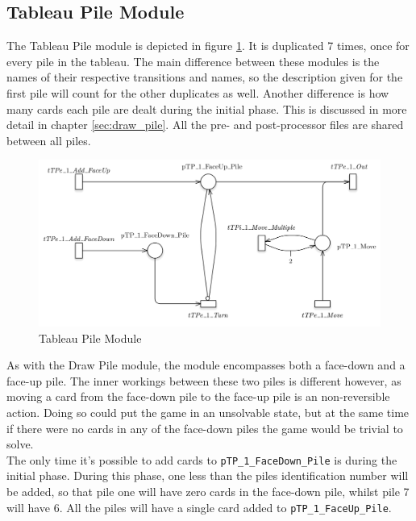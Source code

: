\documentclass[runningheads,a4paper]{llncs}
\begin{document}
\subsection{Tableau Pile Module}
The Tableau Pile module is depicted in figure \ref{fig:tableau_pile}. It is duplicated 7 times, once for every pile in the tableau. The main difference between these modules is the names of their respective transitions and names, so the description given for the first pile will count for the other duplicates as well. Another difference is how many cards each pile are dealt during the initial phase. This is discussed in more detail in chapter \ref{sec:draw_pile}. All the pre- and post-processor files are shared between all piles.
\begin{figure}
	\begin{center}
		\includegraphics[width=\textwidth]{images/tableauPile}
		\caption{Tableau Pile Module}
		\label{fig:tableau_pile}
	\end{center}
\end{figure}

As with the Draw Pile module, the module encompasses both a face-down and a face-up pile. The inner workings between these two piles is different however, as moving a card from the face-down pile to the face-up pile is an non-reversible action. Doing so could put the game in an unsolvable state, but at the same time if there were no cards in any of the face-down piles the game would be trivial to solve. \\

The only time it's possible to add cards to \verb!pTP_1_FaceDown_Pile! is during the initial phase. During this phase, one less than the piles identification number will be added, so that pile one will have zero cards in the face-down pile, whilst pile 7 will have 6. All the piles will have a single card added to \verb!pTP_1_FaceUp_Pile!. \\
\end{document}
